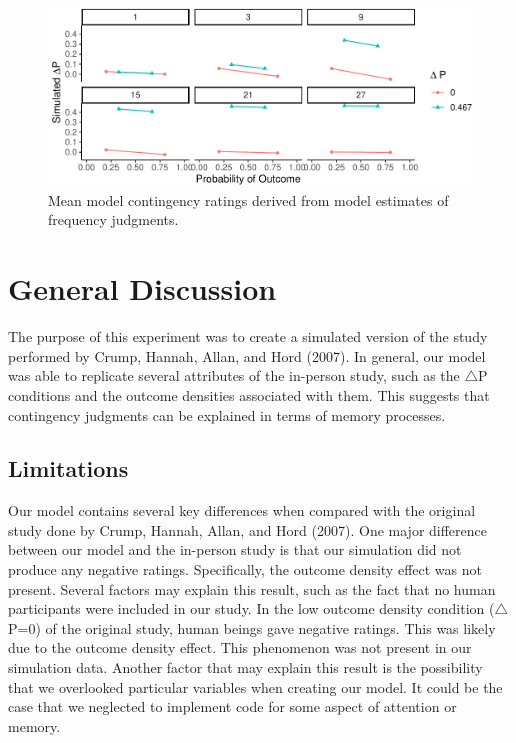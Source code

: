 \documentclass[
  english,
  man,floatsintext]{apa6}
\begin{document}
\begin{figure}

{\centering \includegraphics{Thesis_google_test_files/figure-latex/unnamed-chunk-8-1} 

}

\caption{Mean model contingency ratings derived from model estimates of frequency judgments.}\label{fig:unnamed-chunk-8}
\end{figure}

\hypertarget{general-discussion}{%
\section{General Discussion}\label{general-discussion}}

The purpose of this experiment was to create a simulated version of the study performed by Crump, Hannah, Allan, and Hord (2007). In general, our model was able to replicate several attributes of the in-person study, such as the \(\triangle\)P conditions and the outcome densities associated with them. This suggests that contingency judgments can be explained in terms of memory processes.

\hypertarget{limitations}{%
\subsection{Limitations}\label{limitations}}

Our model contains several key differences when compared with the original study done by Crump, Hannah, Allan, and Hord (2007). One major difference between our model and the in-person study is that our simulation did not produce any negative ratings. Specifically, the outcome density effect was not present. Several factors may explain this result, such as the fact that no human participants were included in our study. In the low outcome density condition (\(\triangle\)P=0) of the original study, human beings gave negative ratings. This was likely due to the outcome density effect. This phenomenon was not present in our simulation data. Another factor that may explain this result is the possibility that we overlooked particular variables when creating our model. It could be the case that we neglected to implement code for some aspect of attention or memory.
\end{document}
